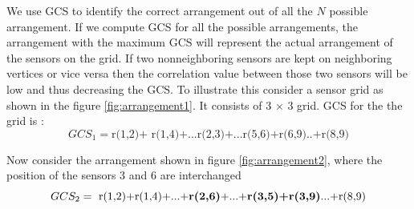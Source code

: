 We use GCS to identify the correct arrangement out of all the $N$ possible arrangement. If we compute  GCS for all the possible arrangements, the arrangement with the maximum GCS will represent the actual arrangement of the sensors on the grid.  
If two nonneighboring sensors are kept on neighboring vertices or vice versa then the correlation value between those two sensors will be low and thus decreasing the GCS.
To illustrate this consider a sensor grid as shown in the figure \ref{fig:arrangement1}.
 It consists of 3 $\times$ 3 grid.  
GCS for the  the grid is :\\
\begin{equation*}
GCS_{1}=\text{r(1,2)+ r(1,4)+...r(2,3)+...r(5,6)+r(6,9)..+r(8,9)}
\end{equation*}

Now consider the arrangement shown in figure \ref{fig:arrangement2}, where the position of the sensors 3 and 6 are interchanged\\
\begin{equation*}
GCS_{2}=\text{ r(1,2)+r(1,4)+...+\textbf{r(2,6)}+...+\textbf{r(3,5)+r(3,9)}...+r(8,9)}
\end{equation*}

